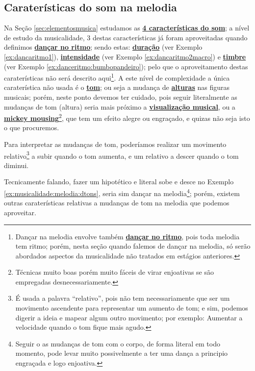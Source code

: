 \subsection{Caraterísticas do som na melodia} 
Na 
Seção \ref{sec:elementosmusica} estudamos as \hyperref[sec:carateristasom]{\textbf{4 características do som}};
a nível de estudo da musicalidade, 
3 destas características já foram aproveitadas quando definimos \hyperref[subsec:dancaritmo]{\textbf{dançar no ritmo}};
sendo estas: 
\hyperref[sec:pos:Duracion]{\textbf{duração}} (ver Exemplo \ref{ex:dancaritmo1}), 
\hyperref[sec:pos:Intensidade]{\textbf{intensidade}} (ver Exemplo \ref{ex:dancaritmo2macro}) e 
\hyperref[sec:pos:timbre]{\textbf{timbre}} (ver Exemplo \ref{ex:danceritmo:bumbopandeiro});
pelo que o aproveitamento destas caraterísticas não será descrito aqui\footnote{\label{footn:melodiatemritmo}Dançar 
na melodia envolve também \hyperref[subsec:dancaritmo]{\textbf{dançar no ritmo}}, 
pois toda melodia tem ritmo; 
porém, nesta seção quando falemos de dançar na melodia, 
só serão abordados aspectos da musicalidade não tratados em estágios anteriores.}.
A este nível de complexidade a única caraterística não usada é 
o \hyperref[sec:pos:Altura]{\textbf{tom}};
ou seja a mudança de \hyperref[sec:pos:Altura]{\textbf{alturas}} nas figuras musicais;
porém, neste ponto devemos ter cuidado, 
pois seguir literalmente as mudanças de tom (altura)
seria mais próximo a \hyperref[subsubsec:musicvisualization]{\textbf{visualização musical}},
 ou a \hyperref[sec:mikeymousing]{\textbf{mickey mousing}}\footnote{Técnicas 
muito boas porém muito fáceis de virar enjoativas se são empregadas desnecessariamente.},
que tem um efeito alegre ou engraçado, e quizas não seja isto o que procuremos.


\begin{example} 
\label{ex:musicalidade:melodia:dtons}
Para interpretar as mudanças de tom, 
poderíamos realizar um movimento relativo\footnote{É usada a palavra ``relativo'',
pois não tem necessariamente que ser um movimento ascendente para representar um aumento de tom;
e sim, podemos digerir a ideia e mapear algum outro movimento; 
por exemplo: Aumentar a velocidade quando o tom fique mais agudo.} 
a subir quando o tom aumenta,
e um relativo a descer quando o tom diminui.
\end{example}

Tecnicamente falando, 
fazer um hipotético e literal sobe e desce no Exemplo \ref{ex:musicalidade:melodia:dtons}, 
seria sim dançar na melodia\footnote{Seguir o as mudanças de tom com o corpo, 
de forma literal em todo momento, 
pode levar muito possivelmente a ter uma dança a principio engraçada e logo enjoativa.};
porém, 
existem outras caraterísticas relativas a mudanças de tom na melodia que podemos aproveitar. 

